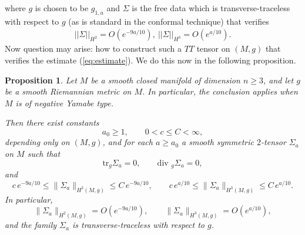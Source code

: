 \documentclass{amsart}
\newtheorem{proposition}{Proposition}[section]
\renewcommand{\div}{\mbox{div }}
\newcommand{\tr}{\mbox{tr}}
\begin{document}
where $g$ is chosen to be $g_{1,a}$ and $\Sigma$ is the free data which is transverse-traceless with respect to $g$ (as is standard in the conformal technique) that verifies 
\begin{align}
\label{eq:estimate}
||\Sigma||_{H^{2}}=O(e^{-9a/10}),~||\Sigma||_{H^{3}}=O(e^{a/10}).
\end{align}
Now question may arise: how to construct such a $TT$ tensor on $(M,g)$ that verifies the estimate (\ref{eq:estimate}). We do this now in the following proposition.
\begin{proposition}
\label{prop:TT_construction_separated_scales}
Let $M$ be a smooth closed manifold of dimension $n\geq 3$, and let $g$ be a smooth Riemannian metric on $M$. In particular, the conclusion applies when $M$ is of negative Yamabe type.

\noindent Then there exist constants
\[
a_{0}\geq 1,
\qquad
0<c\leq C<\infty,
\]
depending only on $(M,g)$, and for each $a\geq a_{0}$ a smooth symmetric $2$-tensor $\Sigma_{a}$ on $M$ such that
\[
\tr_{g}\Sigma_{a}=0,
\qquad
\div_{g}\Sigma_{a}=0,
\]
and
\[
c\,e^{-9a/10}\leq \|\Sigma_{a}\|_{H^{2}(M,g)}\leq C\,e^{-9a/10},
\qquad
c\,e^{a/10}\leq \|\Sigma_{a}\|_{H^{3}(M,g)}\leq C\,e^{a/10}.
\]
In particular,
\[
\|\Sigma_{a}\|_{H^{2}(M,g)}=O(e^{-9a/10}),
\qquad
\|\Sigma_{a}\|_{H^{3}(M,g)}=O(e^{a/10}),
\]
and the family $\Sigma_{a}$ is transverse-traceless with respect to $g$.
\end{proposition}
\end{document}
